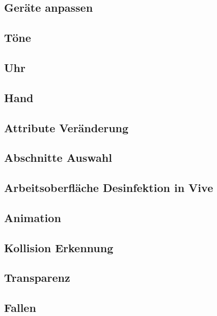  \subsection{Geräte anpassen}
 \subsection{Töne}
 \subsection{Uhr}
 \subsection{Hand}
 \subsection{Attribute Veränderung}
 \subsection{Abschnitte Auswahl}
 \subsection{Arbeitsoberfläche Desinfektion in Vive}
 \subsection{Animation}
 \subsection{Kollision Erkennung}
 \subsection{Transparenz}
 \subsection{Fallen}


